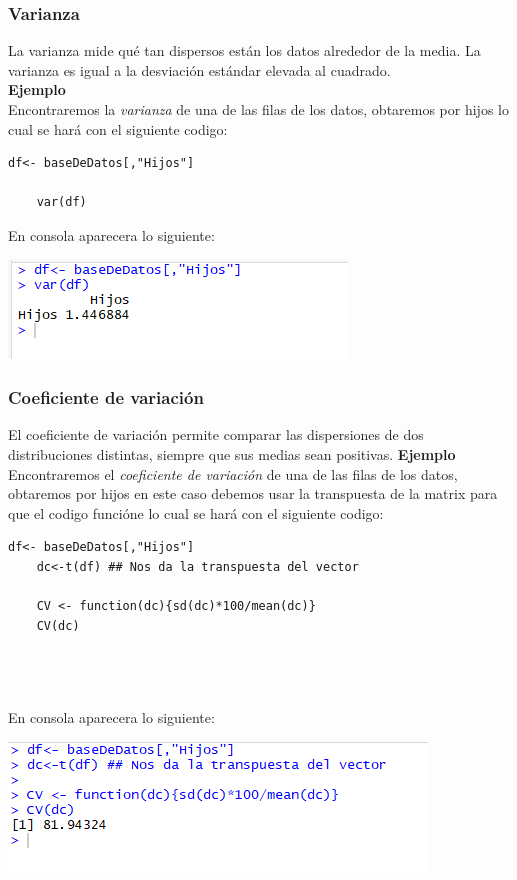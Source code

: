 \documentclass[12pt,hidelinks]{article}
\begin{document}
	\subsubsection{Varianza}
	La varianza mide qué tan dispersos están los datos alrededor de la media. La varianza es igual a la desviación estándar elevada al cuadrado.\\
	\textbf{Ejemplo}\\
	\vspace{2mm}
	Encontraremos la \textit{varianza} de una de las filas de los datos, obtaremos por hijos lo cual se hará con el siguiente codigo:
	\begin{lstlisting}[frame=single]
	df<- baseDeDatos[,"Hijos"]
	
	var(df)
	\end{lstlisting}
	En consola aparecera lo siguiente:
	\begin{center}
		\includegraphics[]{Varianza.PNG}
	\end{center}
	
	\subsubsection{Coeficiente de variación}
	El coeficiente de variación permite comparar las dispersiones de dos distribuciones distintas, siempre que sus medias sean positivas.\newpage
	\textbf{Ejemplo}\\
	\vspace{2mm}
	Encontraremos el \textit{coeficiente de variación} de una de las filas de los datos, obtaremos por hijos  en este caso debemos usar la transpuesta de la matrix para que el codigo funcióne lo cual se hará con el siguiente codigo:
	\begin{lstlisting}[frame=single]
	df<- baseDeDatos[,"Hijos"]
	dc<-t(df) ## Nos da la transpuesta del vector
	
	CV <- function(dc){sd(dc)*100/mean(dc)}
	CV(dc)
	
	
	
	\end{lstlisting}
	En consola aparecera lo siguiente:
	\begin{center}
		\includegraphics[]{Coeficiente_varianza.PNG}
	\end{center}
	
\end{document}
